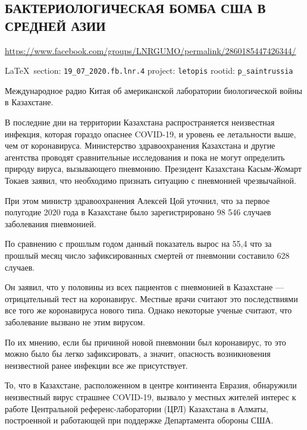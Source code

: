  
 
\subsection{БАКТЕРИОЛОГИЧЕСКАЯ БОМБА США В СРЕДНЕЙ АЗИИ}
\label{sec:19_07_2020.fb.lnr.4}
\url{https://www.facebook.com/groups/LNRGUMO/permalink/2860185447426344/}
  
\vspace{0.5cm}
{\small\LaTeX~section: \verb|19_07_2020.fb.lnr.4| project: \verb|letopis| rootid: \verb|p_saintrussia|}
\vspace{0.5cm}


Международное радио Китая об американской лаборатории биологической войны в
Казахстане.

В последние дни на территории Казахстана распространяется неизвестная инфекция,
которая гораздо опаснее COVID-19, и уровень ее летальности выше, чем от
коронавируса. Министерство здравоохранения Казахстана и другие агентства
проводят сравнительные исследования и пока не могут определить природу вируса,
вызывающего пневмонию.  Президент Казахстана Касым-Жомарт Токаев заявил, что
необходимо признать ситуацию с пневмонией чрезвычайной.

При этом министр здравоохранения Алексей Цой уточнил, что за первое полугодие
2020 года в Казахстане было зарегистрировано 98 546 случаев заболевания
пневмонией.

По сравнению с прошлым годом данный показатель вырос на 55,4%
что за прошлый месяц число зафиксированных смертей от пневмонии составило 628
случаев.

Он заявил, что у половины из всех пациентов с пневмонией в Казахстане —
отрицательный тест на коронавирус.  Местные врачи считают это последствиями все
того же коронавируса нового типа. Однако некоторые ученые считают, что
заболевание вызвано не этим вирусом.

По их мнению, если бы причиной новой пневмонии был коронавирус, то это можно
было бы легко зафиксировать, а значит, опасность возникновения неизвестной
ранее инфекции все же присутствует.

То, что в Казахстане, расположенном в центре континента Евразия, обнаружили
неизвестный вирус страшнее COVID-19, вызвало у местных жителей интерес к работе
Центральной референс-лаборатории (ЦРЛ) Казахстана в Алматы, построенной и
работающей при поддержке Департамента обороны США.


